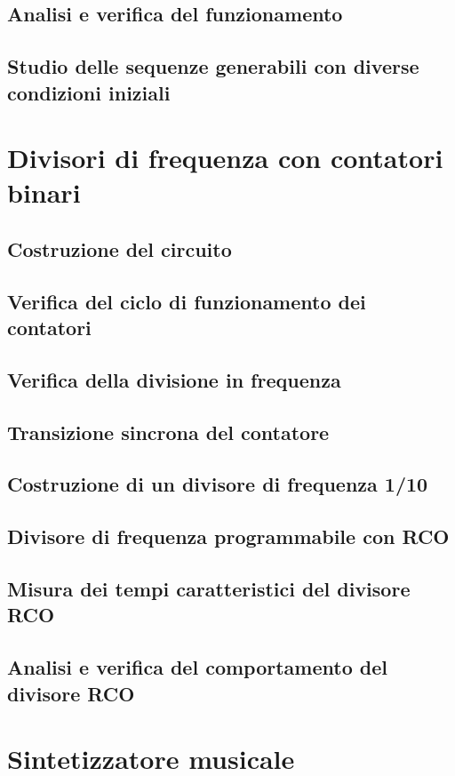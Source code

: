 \documentclass[10pt, a4paper, italian]{article}
\begin{document}
\subsection{Analisi e verifica del funzionamento}
\subsection{Studio delle sequenze generabili con diverse condizioni iniziali}

\section{Divisori di frequenza con contatori binari}
\subsection{Costruzione del circuito}
\subsection{Verifica del ciclo di funzionamento dei contatori}
\subsection{Verifica della divisione in frequenza}
\subsection{Transizione sincrona del contatore}
\subsection{Costruzione di un divisore di frequenza 1/10}
\subsection{Divisore di frequenza programmabile con RCO}
\subsection{Misura dei tempi caratteristici del divisore RCO}
\subsection{Analisi e verifica del comportamento del divisore RCO}

\section{Sintetizzatore musicale}
\end{document}
